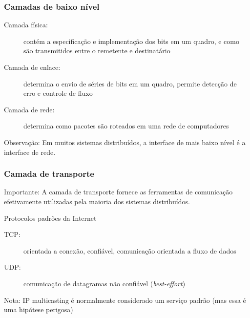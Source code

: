 \documentclass[Ligatures=TeX,table,brazil,svgnames,usetotalslideindicator,compress,10pt]{beamer}
\begin{document}
\begin{frame}
  \frametitle{Camadas de baixo nível}
  \begin{description}
  \item[Camada física:] contém a especificação e implementação dos bits em um quadro, e como são transmitidos entre o remetente e destinatário
  \item[Camada de enlace:] determina o envio de séries de bits em um quadro, permite detecção de erro e controle de fluxo
  \item[Camada de rede:] determina como pacotes são \alert{roteados} em uma rede de computadores
  \end{description}

  \begin{block}{Observação:}
    Em muitos sistemas distribuídos, a interface de mais baixo nível é a interface de rede.
  \end{block}

\end{frame}

\begin{frame}
  \frametitle{Camada de transporte}
  \begin{alertblock}{Importante:}
    A camada de transporte fornece as ferramentas de comunicação efetivamente utilizadas pela maioria dos sistemas distribuídos.
  \end{alertblock}

  \begin{block}{Protocolos padrões da Internet}
    \begin{description}
    \item[TCP:] orientada a conexão, confiável, comunicação orientada a fluxo de dados
    \item[UDP:] comunicação de datagramas não confiável (\textit{best-effort})
    \end{description}
  \end{block}

  \begin{alertblock}{Nota:}
    IP multicasting é normalmente considerado um serviço padrão (mas essa é uma hipótese perigosa)
  \end{alertblock}

\end{frame}
\end{document}
